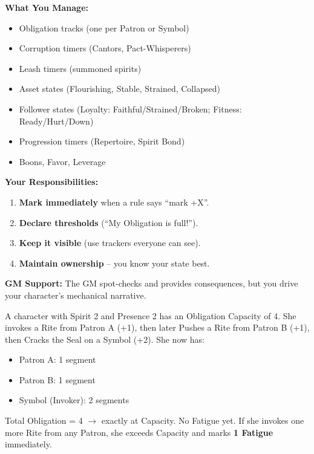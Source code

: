\begin{tcolorbox}[colback=black!3!white,colframe=black!40!white,title=\textbf{You Track Your Own Story},breakable]
\textbf{What You Manage:}
\begin{itemize}
    \item Obligation tracks (one per Patron or Symbol)
    \item Corruption timers (Cantors, Pact-Whisperers)
    \item Leash timers (summoned spirits)
    \item Asset states (Flourishing, Stable, Strained, Collapsed)
    \item Follower states (Loyalty: Faithful/Strained/Broken; Fitness: Ready/Hurt/Down)
    \item Progression timers (Repertoire, Spirit Bond)
    \item Boons, Favor, Leverage
\end{itemize}

\textbf{Your Responsibilities:}
\begin{enumerate}
    \item \textbf{Mark immediately} when a rule says ``mark +X''.
    \item \textbf{Declare thresholds} (``My Obligation is full!'').
    \item \textbf{Keep it visible} (use trackers everyone can see).
    \item \textbf{Maintain ownership} -- you know your state best.
\end{enumerate}

\textbf{GM Support:} The GM spot-checks and provides consequences, but you drive your character's mechanical narrative.
\end{tcolorbox}

\begin{tcolorbox}[colback=black!3!white,colframe=black!40!white,title=\textbf{Example: Tracking Your Obligation},breakable]
  A character with Spirit 2 and Presence 2 has an Obligation Capacity of 4.  
  She invokes a Rite from Patron A (+1), then later Pushes a Rite from Patron B (+1), then Cracks the Seal on a Symbol (+2).  
  She now has:
  \begin{itemize}
    \item Patron A: 1 segment
    \item Patron B: 1 segment
    \item Symbol (Invoker): 2 segments
  \end{itemize}
  Total Obligation = 4 $\rightarrow$ exactly at Capacity. No Fatigue yet.  
  If she invokes one more Rite from any Patron, she exceeds Capacity and marks \textbf{1 Fatigue} immediately.
\end{tcolorbox}

